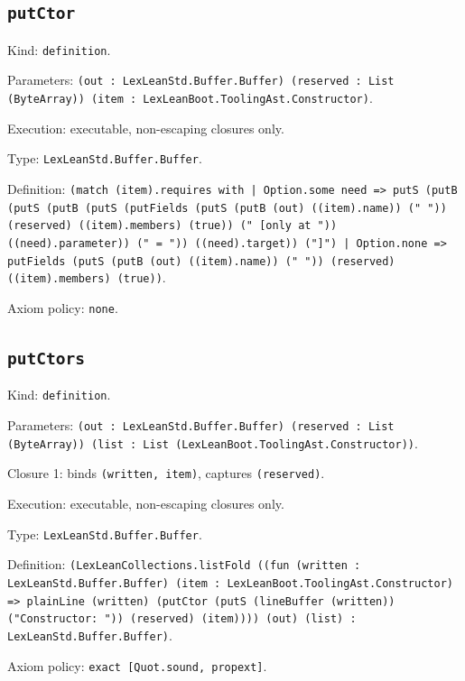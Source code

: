 \documentclass[11pt]{article}
\begin{document}
\subsection*{\texttt{putCtor}}
\noindent Kind: \texttt{definition}.\par
\noindent Parameters: \texttt{(out : LexLeanStd.Buffer.Buffer) (reserved : List (ByteArray)) (item : LexLeanBoot.ToolingAst.Constructor)}.\par
\noindent Execution: executable, non-escaping closures only.\par
\noindent Type: \texttt{LexLeanStd.Buffer.Buffer}.\par
\noindent Definition: \texttt{(match (item).requires with | Option.some need => putS (putB (putS (putB (putS (putFields (putS (putB (out) ((item).name)) (" ")) (reserved) ((item).members) (true)) (" [only at ")) ((need).parameter)) (" = ")) ((need).target)) ("]") | Option.none => putFields (putS (putB (out) ((item).name)) (" ")) (reserved) ((item).members) (true))}.\par
\noindent Axiom policy: \texttt{none}.\par
\subsection*{\texttt{putCtors}}
\noindent Kind: \texttt{definition}.\par
\noindent Parameters: \texttt{(out : LexLeanStd.Buffer.Buffer) (reserved : List (ByteArray)) (list : List (LexLeanBoot.ToolingAst.Constructor))}.\par
\noindent Closure 1: binds \texttt{(written, item)}, captures \texttt{(reserved)}.\par
\noindent Execution: executable, non-escaping closures only.\par
\noindent Type: \texttt{LexLeanStd.Buffer.Buffer}.\par
\noindent Definition: \texttt{(LexLeanCollections.listFold ((fun (written : LexLeanStd.Buffer.Buffer) (item : LexLeanBoot.ToolingAst.Constructor) => plainLine (written) (putCtor (putS (lineBuffer (written)) ("Constructor: ")) (reserved) (item)))) (out) (list) : LexLeanStd.Buffer.Buffer)}.\par
\noindent Axiom policy: \texttt{exact [Quot.sound, propext]}.\par
\end{document}
